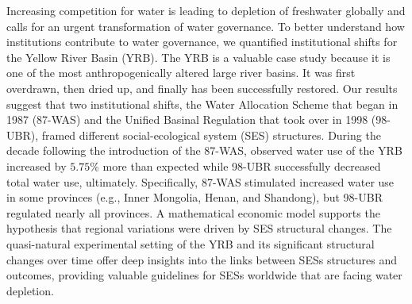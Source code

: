 Increasing competition for water is leading to depletion of freshwater globally and calls for an urgent transformation of water governance. To better understand how institutions contribute to water governance, we quantified institutional shifts for the Yellow River Basin (YRB).  The YRB is a valuable case study because it is one of the most anthropogenically altered large river basins. It was first overdrawn, then dried up, and finally has been successfully restored. Our results suggest that two institutional shifts, the Water Allocation Scheme that began in 1987 (87-WAS) and the Unified Basinal Regulation that took over in 1998 (98-UBR), framed different social-ecological system (SES) structures. During the decade following the introduction of the 87-WAS, observed water use of the YRB increased by $5.75\%$ more than expected while 98-UBR successfully decreased total water use, ultimately. Specifically, 87-WAS stimulated increased water use in some provinces (e.g., Inner Mongolia, Henan, and Shandong), but 98-UBR regulated nearly all provinces. A mathematical economic model supports the hypothesis that regional variations were driven by SES structural changes. The quasi-natural experimental setting of the YRB and its significant structural changes over time offer deep insights into the links between SESs structures and outcomes, providing valuable guidelines for SESs worldwide that are facing water depletion.
